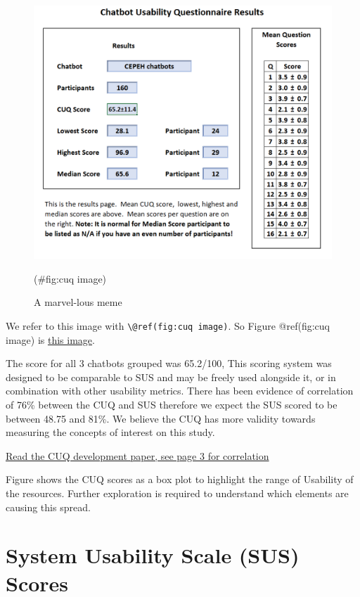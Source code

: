 \documentclass[a4paper, nobind]{templates/ociamthesis}
\begin{document}
\begin{figure}

{\centering \includegraphics[width=0.75\linewidth]{cuq} 

}

\caption{A marvel-lous meme}(\#fig:cuq image)
\end{figure}

We refer to this image with \texttt{\textbackslash{}@ref(fig:cuq\ image)}.
So Figure @ref(fig:cuq image) is \protect\hyperlink{fig:cuqux5cux2520image}{this image}.

The score for all 3 chatbots grouped was 65.2/100,
This scoring system was designed to be comparable to SUS and may be
freely used alongside it, or in combination with other usability
metrics. There has been evidence of correlation of 76\% between the CUQ
and SUS therefore we expect the SUS scored to be between 48.75 and 81\%.
We believe the CUQ has more validity towards measuring the concepts of
interest on this study.

\href{a\%3Chref=\%22https://dl.acm.org/doi/pdf/10.1145/3335082.3335094?casa_token=rGs2gNvKuLkAAAAA:Cd8Qn3QywYHZGYJzbD5CU1dVFWHPLGzDnmQYue6ix-AcqOkWLa7VN4GuzvfrZR2DhhvEAoZOF_2T}{Read the CUQ development paper, see page 3 for correlation}

Figure shows the CUQ scores as a box plot to highlight the range of Usability of the resources. Further exploration is required to understand which elements are causing this spread.

\hypertarget{system-usability-scale-sus-scores}{%
\section{System Usability Scale (SUS) Scores}\label{system-usability-scale-sus-scores}}
\end{document}
